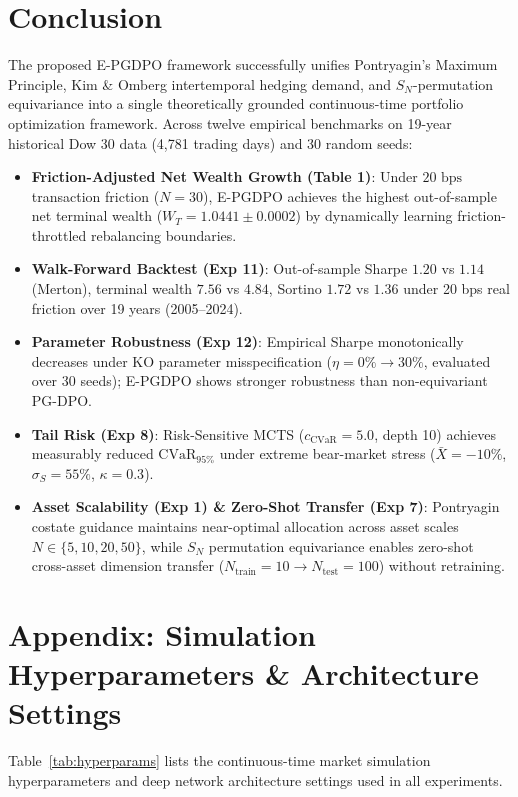 \documentclass[11pt,a4paper]{article}
\theoremstyle{plain}
\theoremstyle{definition}
\theoremstyle{remark}
\begin{document}
\section{Conclusion}
The proposed E-PGDPO framework successfully unifies Pontryagin's Maximum Principle, Kim \& Omberg intertemporal hedging demand, and $S_N$-permutation equivariance into a single theoretically grounded continuous-time portfolio optimization framework. Across twelve empirical benchmarks on 19-year historical Dow 30 data (4,781 trading days) and 30 random seeds:
\begin{itemize}
    \item \textbf{Friction-Adjusted Net Wealth Growth (Table 1)}: Under $20\text{ bps}$ transaction friction ($N=30$), E-PGDPO achieves the highest out-of-sample net terminal wealth ($W_T = 1.0441 \pm 0.0002$) by dynamically learning friction-throttled rebalancing boundaries.
    \item \textbf{Walk-Forward Backtest (Exp 11)}: Out-of-sample Sharpe $1.20$ vs $1.14$ (Merton), terminal wealth $7.56$ vs $4.84$, Sortino $1.72$ vs $1.36$ under 20 bps real friction over 19 years (2005--2024).
    \item \textbf{Parameter Robustness (Exp 12)}: Empirical Sharpe monotonically decreases under KO parameter misspecification ($\eta = 0\% \to 30\%$, evaluated over 30 seeds); E-PGDPO shows stronger robustness than non-equivariant PG-DPO.
    \item \textbf{Tail Risk (Exp 8)}: Risk-Sensitive MCTS ($c_{\text{CVaR}}=5.0$, depth 10) achieves measurably reduced $\text{CVaR}_{95\%}$ under extreme bear-market stress ($\bar{X}=-10\%$, $\sigma_S=55\%$, $\kappa=0.3$).
    \item \textbf{Asset Scalability (Exp 1) \& Zero-Shot Transfer (Exp 7)}: Pontryagin costate guidance maintains near-optimal allocation across asset scales $N \in \{5, 10, 20, 50\}$, while $S_N$ permutation equivariance enables zero-shot cross-asset dimension transfer ($N_{\text{train}}=10 \to N_{\text{test}}=100$) without retraining.
\end{itemize}

\appendix
\section{Appendix: Simulation Hyperparameters \& Architecture Settings}
\label{app:params}
Table~\ref{tab:hyperparams} lists the continuous-time market simulation hyperparameters and deep network architecture settings used in all experiments.
\end{document}
